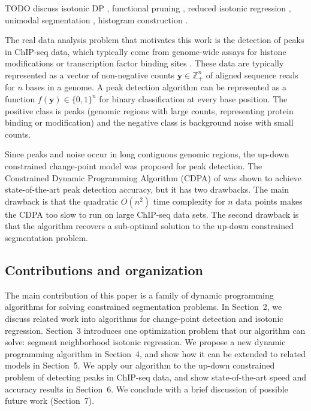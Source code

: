 \documentclass{article}
\newcommand{\ZZ}{\mathbb Z}
\begin{document}
TODO discuss isotonic DP \citep{isotonic-dp}, functional pruning
\citep{phd-johnson}, reduced isotonic regression
\citep{hardwick2014optimal, reduced-monotonic-regression}, unimodal
segmentation \citep{haiminen2008algorithms}, histogram construction
\citep{halim2009fast}.

The real data analysis problem that motivates this work is the
detection of peaks in ChIP-seq data, which typically come from
genome-wide assays for histone modifications or transcription factor
binding sites \citep{practical}. These data are typically represented
as a vector of non-negative counts $\mathbf y\in\ZZ_+^n$ of aligned
sequence reads for $n$ bases in a genome. A peak detection algorithm
can be represented as a function $f(\mathbf y)\in\{0,1\}^n$ for binary
classification at every base position. The positive class is peaks
(genomic regions with large counts, representing protein binding or
modification) and the negative class is background noise with small
counts.


Since peaks and noise occur in long contiguous genomic regions, the
up-down constrained change-point model was proposed for peak
detection. The Constrained Dynamic Programming Algorithm (CDPA) of
\citet{HOCKING-PeakSeg} was shown to achieve state-of-the-art peak
detection accuracy, but it has two drawbacks. The main drawback is
that the quadratic $O(n^2)$ time complexity for $n$ data points makes
the CDPA too slow to run on large ChIP-seq data sets. The second
drawback is that the algorithm recovers a sub-optimal solution to the
up-down constrained segmentation problem.

\subsection{Contributions and organization}

The main contribution of this paper is a family of dynamic programming
algorithms for solving constrained segmentation problems. In
Section~2, we discuss related work into algorithms for change-point
detection and isotonic regression. Section~3 introduces one
optimization problem that our algorithm can solve: segment
neighborhood isotonic regression. We propose a new dynamic programming
algorithm in Section~4, and show how it can be extended to related
models in Section~5. We apply our algorithm to the up-down constrained
problem of detecting peaks in ChIP-seq data, and show state-of-the-art
speed and accuracy results in Section~6. We conclude with a brief
discussion of possible future work (Section~7).
\end{document}
